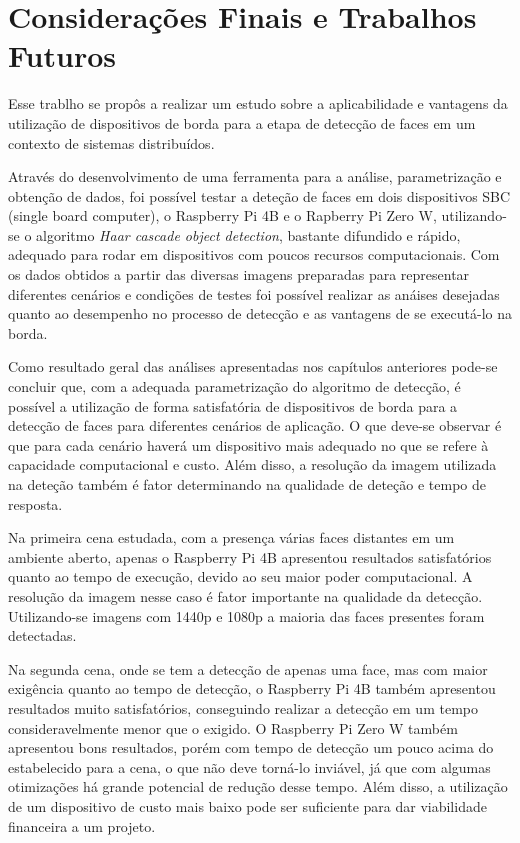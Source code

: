 \chapter{Considerações Finais e Trabalhos \mbox{Futuros}}\label{cap:conclusao}
\thispagestyle{plain}

Esse trablho se propôs a realizar um estudo sobre a aplicabilidade e vantagens da utilização de dispositivos de borda para a etapa de detecção de faces em um contexto de sistemas distribuídos.

Através do desenvolvimento de uma ferramenta para a análise, parametrização e obtenção de dados, foi possível testar a deteção de faces em dois dispositivos SBC (single board computer), o Raspberry Pi 4B e o Rapberry Pi Zero W, utilizando-se o algoritmo \textit{Haar cascade object detection}, bastante difundido e rápido, adequado para rodar em dispositivos com poucos recursos computacionais. Com os dados obtidos a partir das diversas imagens preparadas para representar diferentes cenários e condições de testes foi possível realizar as anáises desejadas quanto ao desempenho no processo de detecção e as vantagens de se executá-lo na borda.

Como resultado geral das análises apresentadas nos capítulos anteriores pode-se concluir que, com a adequada parametrização do algoritmo de detecção, é possível a utilização de forma satisfatória de dispositivos de borda para a detecção de faces para diferentes cenários de aplicação. O que deve-se observar é que para cada cenário haverá um dispositivo mais adequado no que se refere à capacidade computacional e custo. Além disso, a resolução da imagem utilizada na deteção também é fator determinando na qualidade de deteção e tempo de resposta.

Na primeira cena estudada, com a presença várias faces distantes em um ambiente aberto, apenas o Raspberry Pi 4B apresentou resultados satisfatórios quanto ao tempo de execução, devido ao seu maior poder computacional. A resolução da imagem nesse caso é fator importante na qualidade da detecção. Utilizando-se imagens com 1440p e 1080p a maioria das faces presentes foram detectadas.

Na segunda cena, onde se tem a detecção de apenas uma face, mas com maior exigência quanto ao tempo de detecção, o Raspberry Pi 4B também apresentou resultados muito satisfatórios, conseguindo realizar a detecção em um tempo consideravelmente menor que o exigido. O Raspberry Pi Zero W também apresentou bons resultados, porém com tempo de detecção um pouco acima do estabelecido para a cena, o que não deve torná-lo inviável, já que com algumas otimizações há grande potencial de redução desse tempo. Além disso, a utilização de um dispositivo de custo mais baixo pode ser suficiente para dar viabilidade financeira a um projeto.

